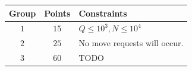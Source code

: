 \begin{center}
\begin{tabular}{| c | c | l |}
  \hline
  \textbf{Group} & \textbf{Points} & \textbf{Constraints} \\ \hline
  $1$    & $15$  & $Q \le 10^3, N \le 10^4$ \\ \hline
  $2$    & $25$  & No move requests will occur. \\ \hline
  $3$    & $60$  & TODO \\ \hline
\end{tabular}
\end{center}
